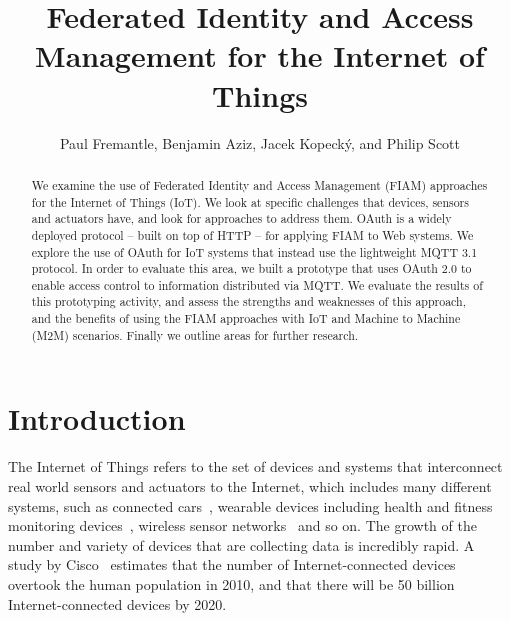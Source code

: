 \documentclass{llncs}
\begin{document}
%
\title{Federated Identity and Access Management for the Internet of Things}
%
%
\author{Paul Fremantle, Benjamin Aziz, Jacek Kopeck\'{y}, and Philip Scott}
%
%

%

\maketitle              %

\begin{abstract}
We examine the use of Federated Identity and Access Management (FIAM) approaches for the Internet of Things (IoT).
We look at specific challenges that devices, sensors and actuators have, and look for approaches to address them.
OAuth is a widely deployed protocol -- built on top of HTTP -- for applying FIAM to Web systems. We explore the use of OAuth for IoT systems that 
instead use the lightweight MQTT 3.1 protocol. 
In order to evaluate this area, we built a prototype that uses OAuth 2.0 to enable access control 
to information distributed via MQTT. We evaluate the results of this prototyping activity, 
and assess the strengths and weaknesses of this approach, and the benefits of using 
the FIAM approaches with IoT and Machine to Machine (M2M) scenarios. 
Finally we outline areas for further research.
\end{abstract}


\section{Introduction}
The Internet of Things refers to the set of devices and systems that interconnect real
world sensors and actuators to the Internet, which includes many different systems, such as 
connected cars~\cite{evans2005connected}, 
wearable devices including health and fitness monitoring devices~\cite{fitbit}, wireless sensor networks~\cite{lewis2004wireless} and so on.  The growth of the number and variety of devices that are collecting data is incredibly rapid.
A study by Cisco~\cite{evans2011internet} estimates that the number of Internet-connected devices
overtook the human population in 2010, and that there will be 50 billion Internet-connected devices 
by 2020. 
\end{document}
